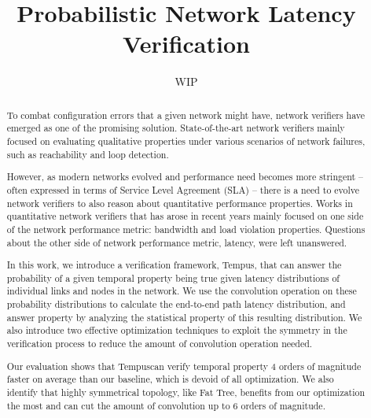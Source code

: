 \documentclass[10pt,sigconf,letterpaper,anonymous,nonacm]{acmart}
\title{Probabilistic Network Latency Verification}
\author{WIP}
\newcommand{\tool}[0]{Tempus}
\begin{document}
\begin{abstract}
    To combat configuration errors that a given network might have, network verifiers have emerged as 
    one of the promising solution. 
    State-of-the-art network verifiers mainly focused on evaluating qualitative properties under 
    various scenarios of network failures, such as reachability and loop detection. 
    
    However, as modern networks evolved and performance need becomes more stringent -- often 
    expressed in terms of Service Level Agreement (SLA) -- there is a need to evolve network 
    verifiers to also reason about quantitative performance properties. 
    Works in quantitative network verifiers that has arose in recent years mainly focused on one 
    side of the network performance metric: bandwidth and load violation properties. 
    Questions about the other side of network performance metric, latency, were left unanswered. 

    In this work, we introduce a verification framework, \tool, that can answer the probability of 
    a given temporal property being true given latency distributions of individual links and 
    nodes in the network. 
    We use the convolution operation on these probability distributions to calculate the end-to-end 
    path latency distribution, and answer property by analyzing the statistical property of this 
    resulting distribution.
    We also introduce two effective optimization techniques to exploit the symmetry in the verification 
    process to reduce the amount of convolution operation needed.
    
    Our evaluation shows that \tool can verify temporal property 4 orders of magnitude faster on average than 
    our baseline, which is devoid of all optimization.
    We also identify that highly symmetrical topology, like Fat Tree, benefits from our optimization the most 
    and can cut the amount of convolution up to 6 orders of magnitude.
\end{abstract}

\maketitle











\end{document}
